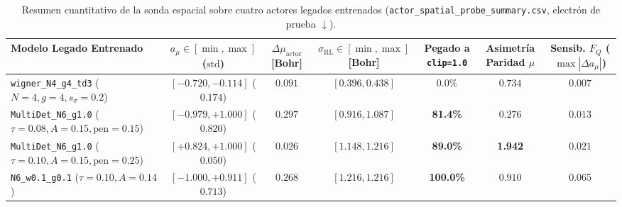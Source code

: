 \documentclass[10pt,a4paper]{article}
\begin{document}
\begin{table}[H]
\centering
\caption{Resumen cuantitativo de la sonda espacial sobre cuatro actores legados entrenados (\texttt{actor\_spatial\_probe\_summary.csv}, electrón de prueba $\downarrow$).}
\label{tab:spatial_probe_legacy}
\begin{adjustbox}{max width=\textwidth}
\begin{tabular}{lcccccc}
\toprule
\textbf{Modelo Legado Entrenado} & \textbf{$a_\mu \in [\min,\max]$ ($\mathrm{std}$)} & \textbf{$\Delta \mu_{\mathrm{actor}}$ [Bohr]} & \textbf{$\sigma_{\mathrm{RL}} \in [\min,\max]$ [Bohr]} & \textbf{Pegado a \texttt{clip=1.0}} & \textbf{Asimetría Paridad $\mu$} & \textbf{Sensib. $F_Q$ ($\max|\Delta a_\mu|$)} \\
\midrule
\texttt{wigner\_N4\_g4\_td3} ($N=4, g=4, s_\sigma=0.2$) & $[-0.720, -0.114]$ ($0.174$) & $0.091$ & $[0.396, 0.438]$ & $0.0\%$ & $0.734$ & $0.007$ \\
\texttt{MultiDet\_N6\_g1.0} ($\tau=0.08, A=0.15, \mathrm{pen}=0.15$) & $[-0.979, +1.000]$ ($0.820$) & $0.297$ & $[0.916, 1.087]$ & \textbf{81.4\%} & $0.276$ & $0.013$ \\
\texttt{MultiDet\_N6\_g1.0} ($\tau=0.10, A=0.15, \mathrm{pen}=0.25$) & $[+0.824, +1.000]$ ($0.050$) & $0.026$ & $[1.148, 1.216]$ & \textbf{89.0\%} & \textbf{1.942} & $0.021$ \\
\texttt{N6\_w0.1\_g0.1} ($\tau=0.10, A=0.14$) & $[-1.000, +0.911]$ ($0.713$) & $0.268$ & $[1.216, 1.216]$ & \textbf{100.0\%} & $0.910$ & $0.065$ \\
\bottomrule
\end{tabular}
\end{adjustbox}
\end{table}
\end{document}
